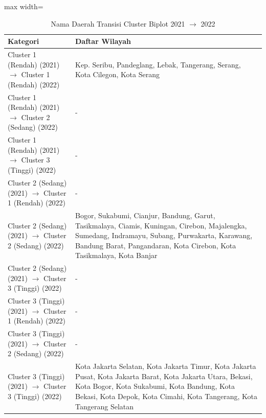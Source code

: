 \begin{table}[H]
\centering
\caption{Nama Daerah Transisi Cluster Biplot 2021 \(\rightarrow\) 2022} \label{tab:app1biplot_trans_name_2021x2022}
\begin{adjustbox}{max width=\textwidth}
\begin{tabular}{|p{4cm}|p{10cm}|}
\hline
\textbf{Kategori} & \textbf{Daftar Wilayah} \\
\hline
Cluster 1 (Rendah) (2021) \(\rightarrow\) Cluster 1 (Rendah) (2022) & Kep. Seribu, Pandeglang, Lebak, Tangerang, Serang, Kota Cilegon, Kota Serang \\
\hline
Cluster 1 (Rendah) (2021) \(\rightarrow\) Cluster 2 (Sedang) (2022) & - \\
\hline
Cluster 1 (Rendah) (2021) \(\rightarrow\) Cluster 3 (Tinggi) (2022) & - \\
\hline
Cluster 2 (Sedang) (2021) \(\rightarrow\) Cluster 1 (Rendah) (2022) & - \\
\hline
Cluster 2 (Sedang) (2021) \(\rightarrow\) Cluster 2 (Sedang) (2022) & Bogor, Sukabumi, Cianjur, Bandung, Garut, Tasikmalaya, Ciamis, Kuningan, Cirebon, Majalengka, Sumedang, Indramayu, Subang, Purwakarta, Karawang, Bandung Barat, Pangandaran, Kota Cirebon, Kota Tasikmalaya, Kota Banjar \\
\hline
Cluster 2 (Sedang) (2021) \(\rightarrow\) Cluster 3 (Tinggi) (2022) & - \\
\hline
Cluster 3 (Tinggi) (2021) \(\rightarrow\) Cluster 1 (Rendah) (2022) & - \\
\hline
Cluster 3 (Tinggi) (2021) \(\rightarrow\) Cluster 2 (Sedang) (2022) & - \\
\hline
Cluster 3 (Tinggi) (2021) \(\rightarrow\) Cluster 3 (Tinggi) (2022) & Kota Jakarta Selatan, Kota Jakarta Timur, Kota Jakarta Pusat, Kota Jakarta Barat, Kota Jakarta Utara, Bekasi, Kota Bogor, Kota Sukabumi, Kota Bandung, Kota Bekasi, Kota Depok, Kota Cimahi, Kota Tangerang, Kota Tangerang Selatan \\
\hline
\end{tabular}
\end{adjustbox}
\end{table}